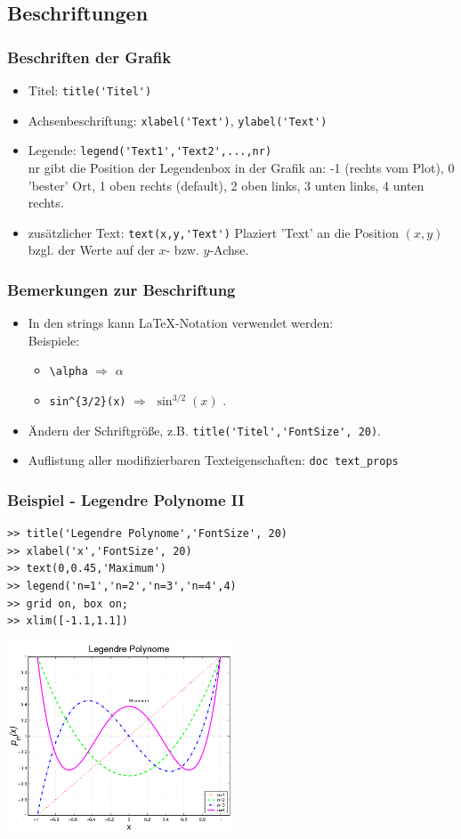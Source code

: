 \subsection{Beschriftungen}
% 
% 
\begin{frame}[fragile]\frametitle{Beschriften der Grafik}
\begin{itemize}
\item Titel:  \alert{ \lstinline!title('Titel')!}
\item Achsenbeschriftung:  \alert{ \lstinline!xlabel('Text')!},
  \alert{ \lstinline!ylabel('Text')!} 
\item Legende: \alert{ \lstinline!legend('Text1','Text2',...,nr)!} \\
{\scriptsize \alert{ nr} gibt die Position der Legendenbox in der Grafik an:
  -1 (rechts vom Plot), 0 'bester' Ort, 1 oben rechts (default), 2
  oben links, 3 unten links, 4 unten rechts. }
\item zusätzlicher Text: \alert{ \lstinline!text(x,y,'Text')!} Plaziert
  'Text' an die Position $(x,y)$ bzgl. der Werte auf der $x$-
  bzw. $y$-Achse. 
\end{itemize}
\end{frame}
% 
% 
\begin{frame}[fragile]\frametitle{Bemerkungen zur Beschriftung}
\begin{itemize}
\item  In den strings kann \LaTeX-Notation verwendet werden: \\
Beispiele: 
\begin{itemize} \item \lstinline!\alpha! $\Rightarrow$ $\alpha$
\item \lstinline!sin^{3/2}(x)! $\Rightarrow$ $\sin^{3/2}(x)$ . 
\end{itemize}
\item Ändern der Schriftgröße, z.B. \lstinline!title('Titel','FontSize', 20)!.
\item Auflistung aller modifizierbaren Texteigenschaften: \lstinline!doc text_props!
\end{itemize}
\end{frame}
% 
% 
\begin{frame}[fragile]\frametitle{Beispiel - Legendre Polynome II}
\begin{lstlisting}[basicstyle=\scriptsize]
>> title('Legendre Polynome','FontSize', 20)
>> xlabel('x','FontSize', 20)
>> text(0,0.45,'Maximum')
>> legend('n=1','n=2','n=3','n=4',4)
>> grid on, box on;
>> xlim([-1.1,1.1])
\end{lstlisting}
\hfil\includegraphics[width=0.5\textwidth]{./figures/grafik_5}\hfil
\end{frame}
